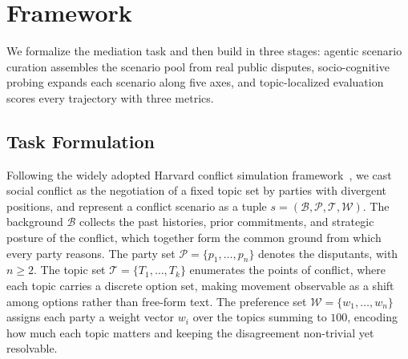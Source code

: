 









\section{\algname{} Framework}
\label{sec:method}

We formalize the mediation task and then build \algname{} in three stages: agentic scenario curation assembles the scenario pool from real public disputes, socio-cognitive probing expands each scenario along five axes, and topic-localized evaluation scores every trajectory with three metrics.

\subsection{Task Formulation}
\label{sec:method:task}

Following the widely adopted Harvard conflict simulation framework~\citep{fisher2011getting}, we cast social conflict as the negotiation of a fixed topic set by parties with divergent positions, and represent a conflict scenario as a tuple $s = (\mathcal{B}, \mathcal{P}, \mathcal{T}, \mathcal{W})$.
%
The background $\mathcal{B}$ collects the past histories, prior commitments, and strategic posture of the conflict, which together form the common ground from which every party reasons. The party set $\mathcal{P} = \{p_1, \dots, p_n\}$ denotes the disputants, with $n \geq 2$. The topic set $\mathcal{T} = \{T_1, \dots, T_k\}$ enumerates the points of conflict, where each topic carries a discrete option set, making movement observable as a shift among options rather than free-form text. The preference set $\mathcal{W} = \{w_1, \dots, w_n\}$ assigns each party a weight vector $w_i$ over the topics summing to $100$, encoding how much each topic matters and keeping the disagreement non-trivial yet resolvable.


